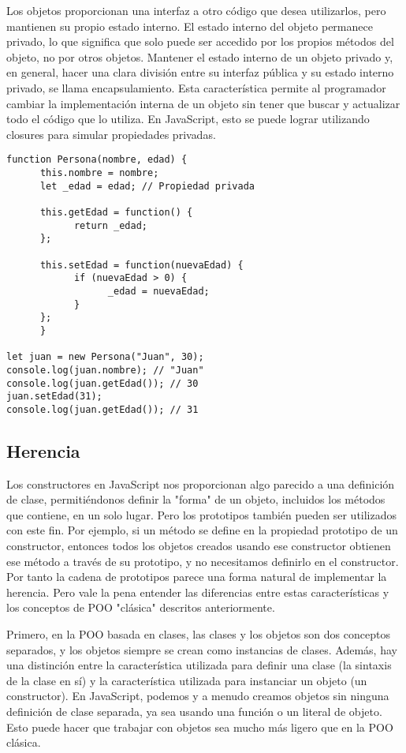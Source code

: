 \documentclass{article}
\begin{document}
Los objetos proporcionan una interfaz a otro código que desea utilizarlos, 
pero mantienen su propio estado interno. El estado interno del objeto permanece 
privado, lo que significa que solo puede ser accedido por los propios métodos 
del objeto, no por otros objetos. Mantener el estado interno de un objeto 
privado y, en general, hacer una clara división entre su interfaz pública y 
su estado interno privado, se llama encapsulamiento. Esta característica 
permite al programador cambiar la implementación interna de un objeto sin 
tener que buscar y actualizar todo el código que lo utiliza. En JavaScript, 
esto se puede lograr utilizando closures para simular propiedades privadas.

\begin{lstlisting}
function Persona(nombre, edad) {
      this.nombre = nombre;
      let _edad = edad; // Propiedad privada
      
      this.getEdad = function() {
            return _edad;
      };
      
      this.setEdad = function(nuevaEdad) {
            if (nuevaEdad > 0) {
                  _edad = nuevaEdad;
            }
      };
      }
      
let juan = new Persona("Juan", 30);
console.log(juan.nombre); // "Juan"
console.log(juan.getEdad()); // 30
juan.setEdad(31);
console.log(juan.getEdad()); // 31
\end{lstlisting}

\subsection{Herencia}

Los constructores en JavaScript nos proporcionan algo parecido a una 
definición de clase, permitiéndonos definir la "forma" de un objeto, 
incluidos los métodos que contiene, en un solo lugar. Pero los prototipos 
también pueden ser utilizados con este fin. Por ejemplo, si un método se define en 
la propiedad prototipo de un constructor, entonces todos los objetos creados 
usando ese constructor obtienen ese método a través de su prototipo, y no 
necesitamos definirlo en el constructor. Por tanto la cadena de prototipos 
parece una forma natural de implementar la herencia. Pero vale la pena 
entender las diferencias entre estas características y los conceptos de 
POO "clásica" descritos anteriormente.

Primero, en la POO basada en clases, las clases y los objetos son dos 
conceptos separados, y los objetos siempre se crean como instancias de 
clases. Además, hay una distinción entre la característica utilizada para 
definir una clase (la sintaxis de la clase en sí) y la característica 
utilizada para instanciar un objeto (un constructor). En JavaScript, 
podemos y a menudo creamos objetos sin ninguna definición de clase 
separada, ya sea usando una función o un literal de objeto. Esto puede hacer 
que trabajar con objetos sea mucho más ligero que en la POO clásica.
\end{document}
